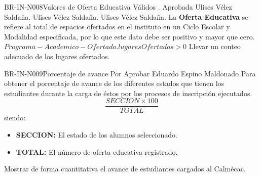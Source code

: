 \begin{BusinessRule}{BR-IN-N008}{Valores de Oferta Educativa Válidos}
	{\bcCondition}    %
	{\btEnabler}     %
	{\blControlling}    %
	.
	\BRItem[Estado] Aprobada
	 Ulises Vélez Saldaña.
	 Ulises Vélez Saldaña.
	 Ulises Vélez Saldaña.
	\BRItem[Descripción] La {\bf Oferta Educativa} se refiere al total de espacios ofertados en el instituto en un Ciclo Escolar y Modalidad especificada, por lo que este dato debe ser positivo y mayor que cero.\\ 
	\BRItem[Sentencia] $Programa-Academico-Ofertado.lugaresOfertados > 0$
	\BRItem[Motivación] Llevar un conteo adecuado de los lugares ofertados.
\end{BusinessRule}

\begin{BusinessRule}{BR-IN-N009}{Porcentaje de avance}
	{\bcCondition}    %
	{\btTimer}     %
	{\blControlling}    %
	\BRItem[Estado] Por Aprobar
	 Eduardo Espino Maldonado
	\BRItem[Descripción] Para obtener el porcentaje de avance de los diferentes estados que tienen los estudiantes durante la carga de éstos por los procesos de inscripción ejecutados.
	\BRItem[Sentencia] $$\frac{SECCION \times 100}{TOTAL}$$
	siendo:
		\begin{itemize}
			\item {\bf SECCION:} El estado de los alumnos seleccionado.
			\item {\bf TOTAL:} El número de oferta educativa registrado.
		\end{itemize}
	\BRItem[Motivación] Mostrar de forma cuantitativa el avance de estudiantes cargados al Calmécac.
\end{BusinessRule}

